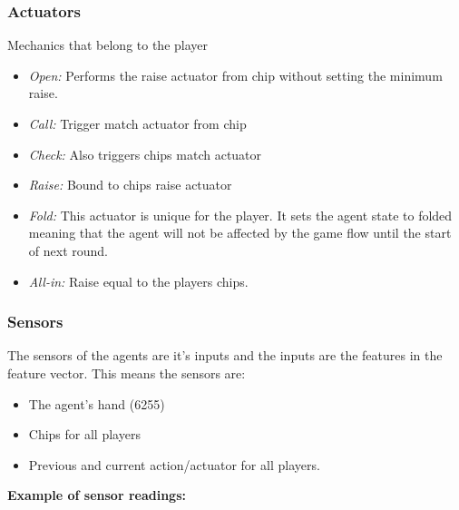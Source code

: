 \documentclass[../main.tex]{subfiles}
\begin{document}
\subsubsection{Actuators}
Mechanics that belong to the player
\begin{itemize}
    \item \textit{Open:} Performs the raise actuator from chip without setting the minimum raise.
    \item \textit{Call:} Trigger match actuator from chip
    \item \textit{Check:} Also triggers chips match actuator
    \item \textit{Raise:} Bound to chips raise actuator
    \item \textit{Fold:} This actuator is unique for the player. It sets the agent state to folded meaning that the agent will not be affected by the game flow until the start of next round.
    \item \textit{All-in:} Raise equal to the players chips.
\end{itemize}


\subsubsection{Sensors}
The sensors of the agents are it's inputs and the inputs are the features in the feature vector. This means the sensors are:
\begin{itemize}
    \item The agent's hand (6255)
    \item Chips for all players 
    \item Previous and current action/actuator for all players.
\end{itemize}

\textbf{Example of sensor readings:} 
\end{document}
